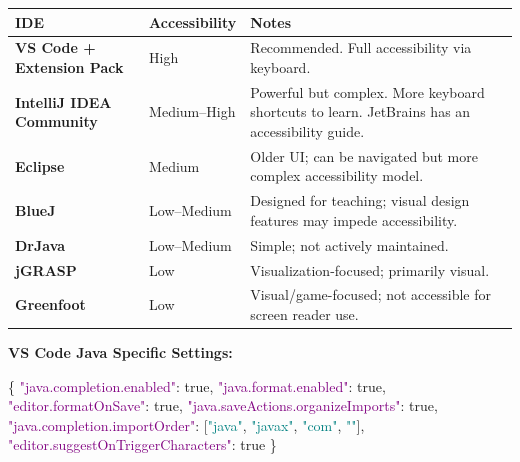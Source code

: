 \documentclass[
  justified,
  openright,
]{tufte-book}
\newcommand{\DataTypeTok}[1]{\textcolor{Purple}{#1}}
\newcommand{\FunctionTok}[1]{\textcolor{BrandBlue}{#1}}
\newcommand{\KeywordTok}[1]{\textcolor{BrandBlue}{#1}}
\newcommand{\OtherTok}[1]{#1}
\newcommand{\StringTok}[1]{\textcolor{Teal}{#1}}
\newenvironment{Shaded}{%
  \begin{snugshade}
}{%
  \end{snugshade}
}
\begin{document}
{\def\LTcaptype{none} %
\begin{longtable}[]{@{}
  >{\raggedright\arraybackslash}p{}
  >{\raggedright\arraybackslash}p{}
  >{\raggedright\arraybackslash}p{}@{}}
\toprule\noalign{}
\begin{minipage}[b]{\linewidth}\raggedright
IDE
\end{minipage} & \begin{minipage}[b]{\linewidth}\raggedright
Accessibility
\end{minipage} & \begin{minipage}[b]{\linewidth}\raggedright
Notes
\end{minipage} \\
\midrule\noalign{}
\endhead
\bottomrule\noalign{}
\endlastfoot
\textbf{VS Code + Extension Pack} & High & Recommended. Full
accessibility via keyboard. \\
\textbf{IntelliJ IDEA Community} & Medium--High & Powerful but complex.
More keyboard shortcuts to learn. JetBrains has an accessibility
guide. \\
\textbf{Eclipse} & Medium & Older UI; can be navigated but more complex
accessibility model. \\
\textbf{BlueJ} & Low--Medium & Designed for teaching; visual design
features may impede accessibility. \\
\textbf{DrJava} & Low--Medium & Simple; not actively maintained. \\
\textbf{jGRASP} & Low & Visualization-focused; primarily visual. \\
\textbf{Greenfoot} & Low & Visual/game-focused; not accessible for
screen reader use. \\
\end{longtable}
}

\textbf{VS Code Java Specific Settings:}

\begin{Shaded}
\begin{Highlighting}[]
\FunctionTok{\{}
  \DataTypeTok{"java.completion.enabled"}\FunctionTok{:} \KeywordTok{true}\FunctionTok{,}
  \DataTypeTok{"java.format.enabled"}\FunctionTok{:} \KeywordTok{true}\FunctionTok{,}
  \DataTypeTok{"editor.formatOnSave"}\FunctionTok{:} \KeywordTok{true}\FunctionTok{,}
  \DataTypeTok{"java.saveActions.organizeImports"}\FunctionTok{:} \KeywordTok{true}\FunctionTok{,}
  \DataTypeTok{"java.completion.importOrder"}\FunctionTok{:} \OtherTok{[}\StringTok{"java"}\OtherTok{,} \StringTok{"javax"}\OtherTok{,} \StringTok{"com"}\OtherTok{,} \StringTok{""}\OtherTok{]}\FunctionTok{,}
  \DataTypeTok{"editor.suggestOnTriggerCharacters"}\FunctionTok{:} \KeywordTok{true}
\FunctionTok{\}}
\end{Highlighting}
\end{Shaded}
\end{document}
